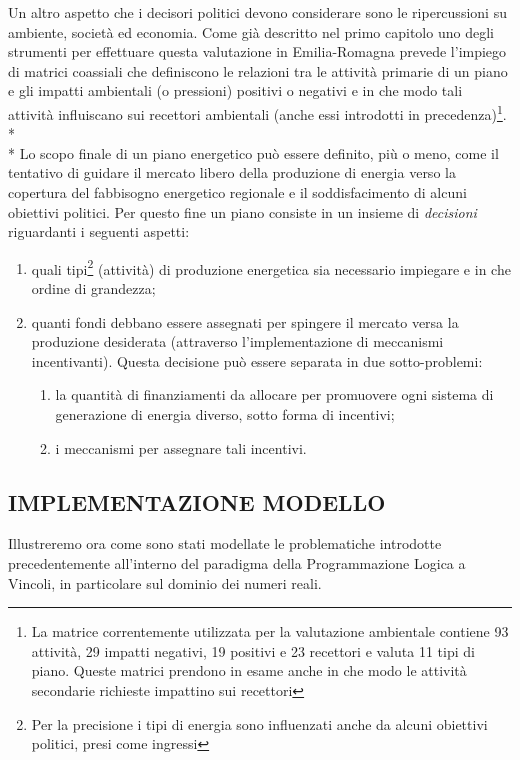 \documentclass[12pt,a4paper,openright,twoside]{report}
\begin{document}
Un altro aspetto che i decisori politici devono considerare sono le ripercussioni su ambiente, società ed economia. Come già descritto nel primo capitolo uno degli strumenti per effettuare questa valutazione in Emilia-Romagna prevede l'impiego di matrici coassiali che definiscono le relazioni tra le attività primarie di un piano e gli impatti ambientali (o pressioni) positivi o negativi e in che modo tali attività influiscano sui recettori ambientali (anche essi introdotti in precedenza)\footnote{La matrice correntemente utilizzata per la valutazione ambientale contiene 93 attività, 29 impatti negativi, 19 positivi e 23 recettori e valuta 11 tipi di piano. Queste matrici prendono in esame anche in che modo le attività secondarie richieste impattino sui recettori}. 
\\*\\*
Lo scopo finale di un piano energetico può essere definito, più o meno, come il tentativo di guidare il mercato libero della produzione di energia verso la copertura del fabbisogno energetico regionale e il soddisfacimento di alcuni obiettivi politici. Per questo fine un piano consiste in un insieme di \emph{decisioni} riguardanti i seguenti aspetti:
\begin{enumerate}
\item quali tipi\footnote{Per la precisione i tipi di energia sono influenzati anche da alcuni obiettivi politici, presi come ingressi} (attività) di produzione energetica sia necessario impiegare e in che ordine di grandezza; 
\item quanti fondi debbano essere assegnati per spingere il mercato versa la produzione desiderata (attraverso l'implementazione di meccanismi incentivanti). Questa decisione può essere separata in due sotto-problemi:
	\begin{enumerate}
	\item la quantità di finanziamenti da allocare per promuovere ogni sistema di generazione di energia diverso, sotto forma di incentivi;
	\item i meccanismi per assegnare tali incentivi. 
	\end{enumerate}
\end{enumerate}

\subsection{IMPLEMENTAZIONE MODELLO}
Illustreremo ora come sono stati modellate le problematiche introdotte precedentemente all'interno del paradigma della Programmazione Logica a Vincoli, in particolare sul dominio dei numeri reali.
\end{document}
